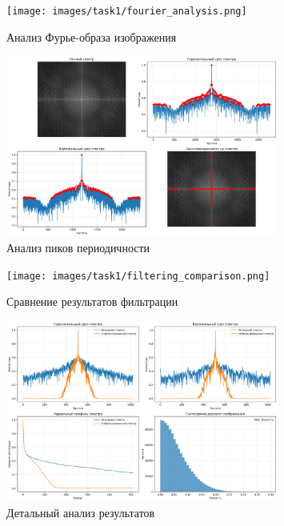\begin{figure}[H]
    \centering
    \texttt{[image: images/task1/fourier\_analysis.png]}
    \caption{Анализ Фурье-образа изображения}
    \label{fig:fourier_analysis}
\end{figure}

\begin{figure}[H]
    \centering
    \includegraphics[width=0.8\textwidth]{images/task1/peak_analysis.png}
    \caption{Анализ пиков периодичности}
    \label{fig:peak_analysis}
\end{figure}

\begin{figure}[H]
    \centering
    \texttt{[image: images/task1/filtering\_comparison.png]}
    \caption{Сравнение результатов фильтрации}
    \label{fig:filtering_comparison}
\end{figure}

\begin{figure}[H]
    \centering
    \includegraphics[width=0.8\textwidth]{images/task1/detailed_analysis.png}
    \caption{Детальный анализ результатов}
    \label{fig:detailed_analysis}
\end{figure}

